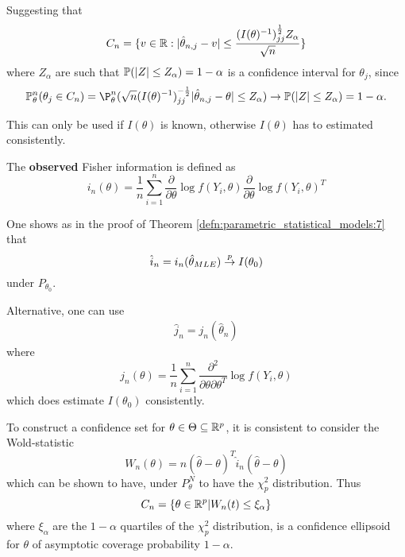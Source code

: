 Suggesting that
\begin{align}
  \label{eq:69}
  C_{n} = \{ v \in \mathbb{R} : | \hat \theta_{n, j}  - v | \leq
  \frac{(I(\theta)^{-1})^{\frac{1}{2}}_{jj} Z_{\alpha}}{\sqrt{n}} \}
\end{align} where $Z_{\alpha}$ are such that $\Prob(|Z| \leq
Z_{\alpha}) = 1 - \alpha$ is a confidence interval for $\theta_{j}$,
since
\begin{align}
  \label{eq:70}
  \Prob_{\theta}^{n}(\theta_{j} \in C_{n}) =
  \P_{\theta}^{n}(\sqrt{n}(I(\theta)^{-1})^{-\frac{1}{2}}_{jj} | \hat
  \theta_{n, j} - \theta| \leq Z_{\alpha}) \rightarrow \Prob{|Z| \leq
    Z_{\alpha}} = 1 - \alpha.
\end{align}

This can only be used if $I(\theta)$ is known, otherwise $I(\theta)$
has to estimated consistently.

\begin{defn}
  \label{defn:parametric_statistical_models:8}
  The \textbf{observed} Fisher information is defined as
  \begin{equation}
    \label{eq:71}
    i_{n}(\theta) = \frac{1}{n} \sum_{i=1}^{n}
    \frac{\partial}{\partial \theta} \log f(Y_{i}, \theta)
    \frac{\partial}{\partial \theta} \log f(Y_{i}, \theta)^{T}
  \end{equation}

  One shows as in the proof of Theorem
  \ref{defn:parametric_statistical_models:7} that
  \begin{equation}
    \label{eq:72}
    \hat i_{n} = i_{n}(\hat \theta_{MLE}) \overset{p}{\rightarrow} I(\theta_{0})
  \end{equation} under $P_{\theta_{0}}$.

  Alternative, one can use
  \begin{align}
    \label{eq:73}
    \hat j_{n} = j_{n}(\hat \theta_{n})
  \end{align} where
  \begin{equation}
    \label{eq:74}
    j_{n}(\theta) = \frac{1}{n} \sum_{i=1}^{n}
    \frac{\partial^{2}}{\partial \theta \partial \theta^{T}} \log
    f(Y_{i}, \theta)
  \end{equation} which does estimate $I(\theta_{0})$ consistently.
\end{defn}

To construct a confidence set for $\theta \in \Theta \subseteq
\mathbb{R}^{p}$, it is consistent to consider the Wold-statistic
\begin{equation}
  \label{eq:75}
  W_{n}(\theta) = n(\hat \theta - \theta)^{T} \hat i_{n}(\hat \theta - \theta)
\end{equation} which can be shown to have, under $P_{\theta}^{N}$ to
have the $\chi^{2}_{p}$ distribution. Thus
\begin{equation}
  \label{eq:76}
  C_{n} = \{ \theta \in \mathbb{R}^{p} | W_{n}(t) \leq \xi_{\alpha} \}
\end{equation} where $\xi_{\alpha}$ are the $1-\alpha$ quartiles of
the $\chi^{2}_{p}$ distribution, is a confidence ellipsoid for
$\theta$ of asymptotic coverage probability $1-\alpha$.

